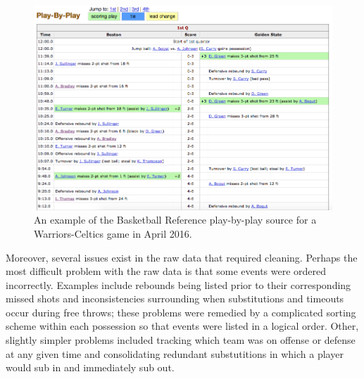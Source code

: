 \begin{figure}
    \centering
    \includegraphics[width=\textwidth]{figures/bkref_pbp}
    \caption{An example of the Basketball Reference play-by-play source for a
    Warriors-Celtics game in April 2016.}
    \label{fig:bkref_pbp}
\end{figure}

Moreover, several issues exist in the raw data that required cleaning. Perhaps the
most difficult problem with the raw data is that some events were ordered
incorrectly. Examples include rebounds being listed prior to their corresponding
missed shots and inconsistencies surrounding when substitutions and timeouts occur
during free throws; these problems were remedied by a complicated sorting scheme
within each possession so that events were listed in a logical order. Other,
slightly simpler problems included tracking which team was on offense or defense at
any given time and consolidating redundant substutitions in which a player would sub
in and immediately sub out.

